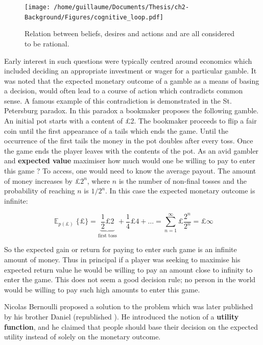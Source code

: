 \begin{figure}
 \centering
 \texttt{[image: /home/guillaume/Documents/Thesis/ch2-Background/Figures/cognitive\_loop.pdf]}
  \caption{Relation between beliefs, desires and actions and are all considered to be rational.}
\end{figure}

Early interest in such questions were typically centred around economics which included deciding an appropriate 
investment or wager for a particular gamble. It was noted that the expected monetary outcome of a gamble as a means of basing a 
decision, would often lead to a course of action which contradicts common sense. A famous example of this contradiction
is demonstrated in the St. Petersburg paradox. In this paradox a bookmaker proposes the following gamble. 
An initial pot starts with a content of \pounds2. The bookmaker proceeds to flip a fair coin until the first appearance of a 
tails which ends the game. Until the occurrence of the first tails the money in the pot doubles after every toss. Once the 
game ends the player leaves with the contents of the pot. As an avid gambler and \textbf{expected value} maximiser how much 
would one be willing to pay to enter this game ? To access, one would need to know the average payout. The amount 
of money increases by \pounds$2^{n}$, where $n$ is the number of non-final tosses and the probability of 
reaching $n$ is $1/2^{n}$. In this case the expected monetary outcome is infinite:

\begin{equation*}
\displaystyle \mathop{\mathbb{E}}_{p(\pounds)}\{\pounds\} = \underbrace{\frac{1}{2} \pounds2}_{\textrm{first toss}} + \frac{1}{4} \pounds4 + \dots = \sum\limits_{n=1}^{\infty} 
\pounds\frac{2^{n}}{2^{n}} = \pounds\infty 
\end{equation*}

So the expected gain or return for paying to enter such game is an infinite amount of money. Thus in principal if a player was
seeking to maximise his expected return value he would be willing to pay an amount close to infinity to enter the game. 
This does not seem a good decision rule; no person in the world would be willing to pay such high amounts to enter this game.

Nicolas Bernoulli proposed a solution to the problem which was later published by his brother Daniel (republished \cite{Bernoulli1954}). 
He introduced the notion of a \textbf{utility function}, and he claimed that people should base their decision on 
the expected utility instead of solely on the monetary outcome.


